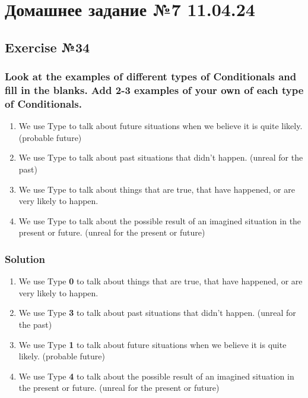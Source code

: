 \chapter{Домашнее задание №7 11.04.24}

\section{Exercise №34}
\subsection*{Look at the examples of different types of Conditionals and fill in the blanks. Add 2-3
      examples of your own of each type of Conditionals.}
\begin{enumerate}
      \item We use Type \underline{\hspace{1cm}} to talk about future situations when we believe it is quite likely. (probable future)
      \item We use Type \underline{\hspace{1cm}} to talk about past situations that didn't happen. (unreal for the past)
      \item We use Type \underline{\hspace{1cm}} to talk about things that are true, that have happened, or are very likely to happen.
      \item We use Type \underline{\hspace{1cm}} to talk about the possible result of an imagined situation in the present or future. (unreal for the present or future)
\end{enumerate}

\subsection*{Solution}
\begin{enumerate}
      \item We use Type \textbf{0} to talk about things that are true, that have happened, or are very likely to happen.
      \item We use Type \textbf{3} to talk about past situations that didn't happen. (unreal for the past)
      \item We use Type \textbf{1} to talk about future situations when we believe it is quite likely. (probable future)
      \item We use Type \textbf{4} to talk about the possible result of an imagined situation in the present or future. (unreal for the present or future)
\end{enumerate}



